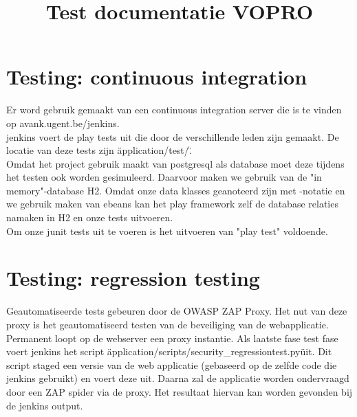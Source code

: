 \documentclass[10pt,a4paper]{article}
\title{Test documentatie VOPRO}
\begin{document}
\section*{Testing: continuous integration}
Er word gebruik gemaakt van een continuous integration server die is te vinden op avank.ugent.be/jenkins.\\
jenkins voert de play tests uit die door de verschillende leden zijn gemaakt. De locatie van deze tests zijn \"application/test/\". \\

Omdat het project gebruik maakt van postgresql als database moet deze tijdens het testen ook worden gesimuleerd. Daarvoor maken we gebruik van de "in memory"-database H2. Omdat onze data klasses geanoteerd zijn met \@ -notatie en we gebruik maken van ebeans kan het play framework zelf de database relaties namaken in H2 en onze tests uitvoeren.\\

Om onze junit tests uit te voeren is het uitvoeren van "play test" voldoende.
\section*{Testing: regression testing}
Geautomatiseerde tests gebeuren door de OWASP ZAP Proxy. Het nut van deze proxy is het geautomatiseerd testen van de beveiliging van de webapplicatie. \\
Permanent loopt op de webserver een proxy instantie. Als laatste fase test fase voert jenkins het script \"application/scripts/security\_regressiontest.py\" uit. Dit script staged een versie van de web applicatie (gebaseerd op de zelfde code die jenkins gebruikt) en voert deze uit. Daarna zal de applicatie worden ondervraagd door een ZAP spider via de proxy. Het resultaat hiervan kan worden gevonden bij de jenkins output. 
\end{document}
